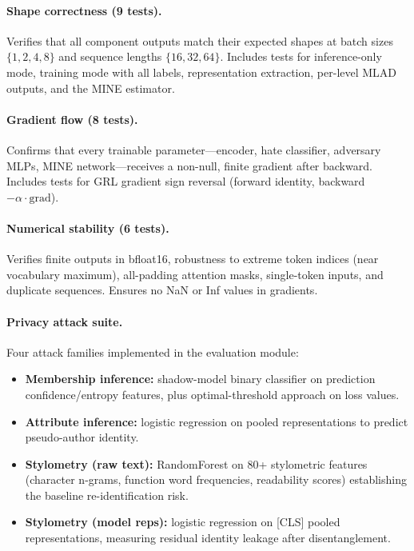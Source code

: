 \documentclass{article}
\begin{document}
\paragraph{Shape correctness (9 tests).}
Verifies that all component outputs match their expected shapes at batch
sizes $\{1, 2, 4, 8\}$ and sequence lengths $\{16, 32, 64\}$.
Includes tests for inference-only mode, training mode with all labels,
representation extraction, per-level MLAD outputs, and the MINE
estimator.

\paragraph{Gradient flow (8 tests).}
Confirms that every trainable parameter---encoder, hate classifier,
adversary MLPs, MINE network---receives a non-null, finite gradient
after backward. Includes tests for GRL gradient sign reversal
(forward identity, backward $-\alpha \cdot \text{grad}$).

\paragraph{Numerical stability (6 tests).}
Verifies finite outputs in bfloat16, robustness to extreme token
indices (near vocabulary maximum), all-padding attention masks,
single-token inputs, and duplicate sequences. Ensures no NaN or Inf
values in gradients.

\paragraph{Privacy attack suite.}
Four attack families implemented in the evaluation module:
\begin{itemize}
  \item \textbf{Membership inference:} shadow-model binary classifier on
        prediction confidence/entropy features, plus optimal-threshold
        approach on loss values.
  \item \textbf{Attribute inference:} logistic regression on pooled
        representations to predict pseudo-author identity.
  \item \textbf{Stylometry (raw text):} RandomForest on 80+ stylometric
        features (character n-grams, function word frequencies,
        readability scores) establishing the baseline re-identification
        risk.
  \item \textbf{Stylometry (model reps):} logistic regression on
        [CLS] pooled representations, measuring residual identity
        leakage after disentanglement.
\end{itemize}
\end{document}
